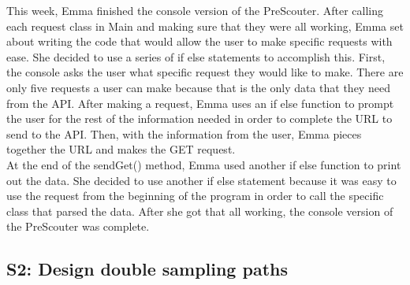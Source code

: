 \documentclass{article}
\begin{document}
This week, Emma finished the console version of the PreScouter. After calling each request class in Main and making sure that they were all working, Emma set about writing the code that would allow the user to make specific requests with ease. She decided to use a series of if else statements to accomplish this. First, the console asks the user what specific request they would like to make. There are only five requests a user can make because that is the only data that they need from the API. After making a request, Emma uses an if else function to prompt the user for the rest of the information needed in order to complete the URL to send to the API. Then, with the information from the user, Emma pieces together the URL and makes the GET request.\\

At the end of the sendGet() method, Emma used another if else function to print out the data. She decided to use another if else statement because it was easy to use the request from the beginning of the program in order to call the specific class that parsed the data. After she got that all working, the console version of the PreScouter was complete. \\


\subsection{S2: Design double sampling paths}
\end{document}
